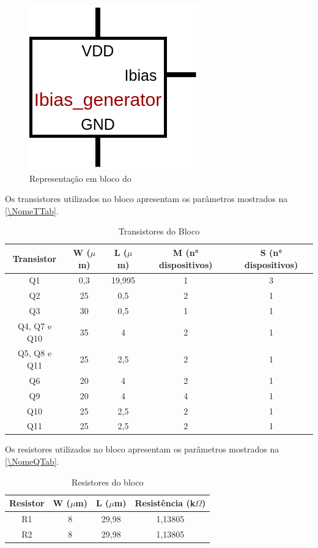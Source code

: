 \begin{figure}[htb]
 \centering
    \centering
    \caption{Representa{\c c}\~ao em bloco do \NomeBloco} \label{\NomeSFig}
    \includegraphics[scale=0.5]{Circuitos/ibias_generator_block.png}
\end{figure}

Os transistores utilizados no bloco \NomeBloco{} apresentam os par\^ametros mostrados na \autoref{\NomeTTab}.

\begin{table}[htbp]
\caption{Transistores do Bloco \NomeBloco}
\label{\NomeTTab}
\centering
\begin{tabular}{ccccc}
\toprule
Transistor & W ($\mu$m)  & L ($\mu$m)           & M (n° dispositivos) & S (n° dispositivos)\\
\midrule \midrule
Q1 & 0,3 & 19,995 & 1 & 3\\
\midrule
Q2 & 25 & 0,5 & 2 & 1\\
\midrule
Q3 & 30 & 0,5 & 1 & 1\\
\midrule
Q4, Q7 e Q10 & 35 & 4 & 2 & 1\\
\midrule
Q5, Q8 e Q11 & 25 & 2,5 & 2 & 1\\
\midrule
Q6 & 20 & 4 & 2 & 1\\
\midrule
Q9 & 20 & 4 & 4 & 1\\
\midrule
Q10 & 25 & 2,5 & 2 & 1\\
\midrule
Q11 & 25 & 2,5 & 2 & 1\\
\bottomrule
\end{tabular}
\end{table}

Os resistores utilizados no bloco \NomeBloco{} apresentam os par\^ametros mostrados na \autoref{\NomeQTab}.

\begin{table}[htbp]
\caption{Resistores do bloco \NomeBloco}
\label{\NomeQTab}
\centering
\begin{tabular}{cccc}
\toprule
Resistor & W ($\mu$m)  & L ($\mu$m) & Resist\^encia (k$\Omega$)\\
\midrule \midrule
R1 & 8 & 29,98 & 1,13805\\
\midrule
R2 & 8 & 29,98 & 1,13805\\
\bottomrule
\end{tabular}
\end{table}

